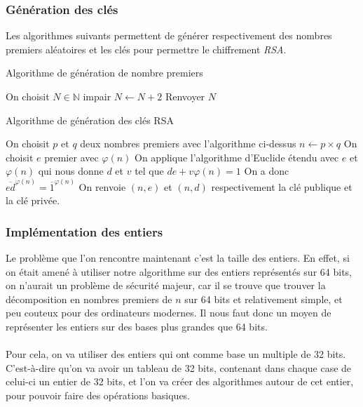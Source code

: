 \documentclass[12 pt]{article}
\begin{document}
\subsubsection{Génération des clés}

Les algorithmes suivants permettent de générer respectivement des nombres premiers aléatoires et les clés pour permettre le chiffrement \textit{RSA}.

\begin{algorithm}
	\caption{Algorithme de génération de nombre premiers}
	\label{generation_premier}
	\begin{algorithmic}[1]
		\State On choisit $N \in \mathbb{N}$ impair
		\State $N \leftarrow N+2$
		\EndWhile
		\State Renvoyer $N$
	\end{algorithmic}
\end{algorithm}

\begin{algorithm}
	\caption{Algorithme de génération des clés RSA}
	\label{generation_cles}
	\begin{algorithmic}[1]
		\State On choisit $p$ et $q$ deux nombres premiers avec l'algorithme ci-dessus
		\State $n \leftarrow p \times q$
		\State On choisit $e$ premier avec $\varphi(n)$
		\State On applique l'algorithme d'Euclide étendu avec $e$ et $\varphi(n)$ qui nous donne $d$ et $v$ tel que $de + v\varphi(n) = 1$
		\State On a donc $\overline{ed}^{\varphi(n)} = \overline{1}^{\varphi(n)}$
		\State On renvoie $(n, e)$ et $(n, d)$ respectivement la clé publique et la clé privée.
	\end{algorithmic}
\end{algorithm}

\subsubsection{Implémentation des entiers}

Le problème que l'on rencontre maintenant c'est la taille des entiers. En effet, si on était amené à utiliser notre algorithme sur des entiers représentés sur 64 bits, on n'aurait un problème de sécurité majeur, car il se trouve que trouver la décomposition en nombres premiers de $n$ sur 64 bits et relativement simple, et peu couteux pour des ordinateurs modernes. Il nous faut donc un moyen de représenter les entiers sur des bases plus grandes que 64 bits.\\\\
Pour cela, on va utiliser des entiers qui ont comme base un multiple de 32 bits. C'est-à-dire qu'on va avoir un tableau de 32 bits, contenant dans chaque case de celui-ci un entier de 32 bits, et l'on va créer des algorithmes autour de cet entier, pour pouvoir faire des opérations basiques.
\\
\end{document}
